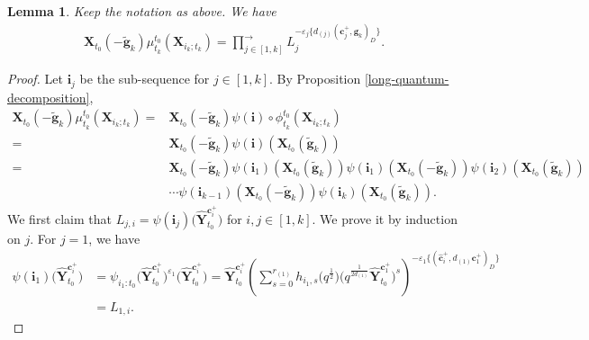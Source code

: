 \documentclass[10pt,a4paper]{amsart}
\numberwithin{equation}{section}
\newtheorem{Lemma}[Theorem]{Lemma}
\begin{document}
\begin{Lemma}\label{product_of_F_polynomial}
 Keep the notation as above. We have
 \begin{align}\label{eq:f-poly-well-def}
 \mathbf{X}_{t_{0}}(-\mathbf{\tilde{g}}_{k})\mu_{t_{k}}^{t_{0}}(\mathbf{X}_{i_{k};t_{k}})=\prod\limits^{\longrightarrow}_{j\in[1,k]}L_{j}^{-\varepsilon_{j}\{d_{(j)}(\mathbf{c}_{j}^{+},\mathbf{g}_{k})_D\}}.
 \end{align}

\end{Lemma}
\begin{proof}
 Let $\mathbf{i}_{j}$ be the sub-sequence  for $j\in [1,k]$.
 By Proposition \ref{long-quantum-decomposition},
 \begin{align*}
 \mathbf{X}_{t_{0}}(-\mathbf{\tilde{g}}_{k})\mu_{t_{k}}^{t_{0}}(\mathbf{X}_{i_{k};t_{k}})
 ={}&\mathbf{X}_{t_{0}}(-\mathbf{\tilde{g}}_{k})\psi(\mathbf{i})\circ\phi_{t_{k}}^{t_0}(\mathbf{X}_{i_{k};t_{k}})\\
 ={}&\mathbf{X}_{t_{0}}(-\mathbf{\tilde{g}}_{k})\psi(\mathbf{i})(\mathbf{X}_{t_{0}}(\mathbf{\tilde{g}}_{k}))\\
 ={}&\mathbf{X}_{t_{0}}(-\mathbf{\tilde{g}}_{k})\psi(\mathbf{i}_{1})(\mathbf{X}_{t_{0}}(\mathbf{\tilde{g}}_{k}))\psi(\mathbf{i}_{1})(\mathbf{X}_{t_{0}}(-\mathbf{\tilde{g}}_{k}))\psi(\mathbf{i}_{2})(\mathbf{X}_{t_{0}}(\mathbf{\tilde{g}}_{k}))\\
 &\cdots\psi(\mathbf{i}_{k-1})(\mathbf{X}_{t_{0}}(-\mathbf{\tilde{g}}_{k}))\psi(\mathbf{i}_{k})(\mathbf{X}_{t_{0}}(\mathbf{\tilde{g}}_{k})).
 \end{align*}
 We first claim that $L_{j,i}=\psi(\mathbf{i}_{j})\bigl(\mathbf{\hat{Y}}_{t_{0}}^{\mathbf{c}_{i}^{+}}\bigr)$
 for $i,j\in[1,k]$. We prove it by induction on $j$.
 For $j=1$, we have
 \begin{align*}
 \psi(\mathbf{i}_{1})\bigl(\mathbf{\hat{Y}}_{t_{0}}^{\mathbf{c}_{i}^{+}}\bigr)
 &=\psi_{i_{1}:t_{0}}\bigl(\mathbf{\hat{Y}}_{t_{0}}^{\mathbf{c}_{1}^{+}}\bigr)^{\varepsilon_{1}}\bigl(\mathbf{\hat{Y}}_{t_{0}}^{\mathbf{c}_{i}^{+}}\bigr)=\mathbf{\hat{Y}}_{t_{0}}^{\mathbf{c}_{i}^{+}}\left(\sum\limits^{r_{(1)}}_{s=0}h_{i_{1},s}\bigl(q^{\frac{1}{2}}\bigr)
 \bigl(q^{\frac{1}{2d_{(1)}}}\mathbf{\hat{Y}}_{t_{0}}^{\mathbf{c}_{1}^{+}}\bigr)^{s}\right)^{-\varepsilon_{1}\{(\mathbf{\hat{c}}_{i}^{+},d_{(1)}\mathbf{c}_{1}^{+})_{D}\}}\\
 &=L_{1,i}.
 \end{align*}

\end{proof}
\end{document}
